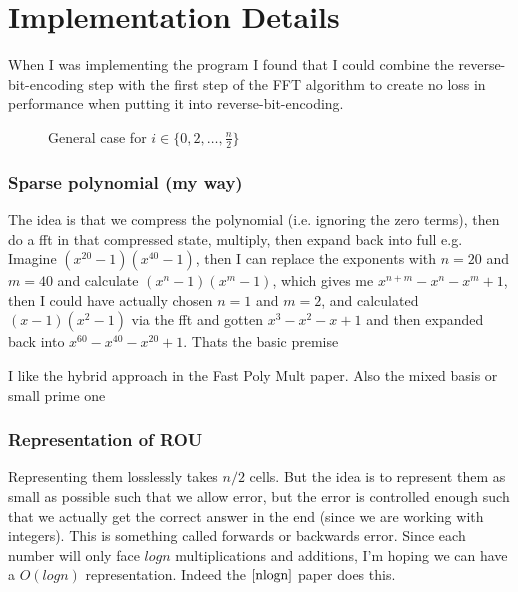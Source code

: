 \chapter{Implementation Details}\label{impl-details}

When I was implementing the program I found that I could combine the reverse-bit-encoding step with the first step of the FFT algorithm to create no loss in performance when putting it into reverse-bit-encoding.
\begin{figure}
    \centering
    \caption{General case for $i \in \{0, 2, \ldots, \frac{n}{2}\}$}
\end{figure}

\subsection{Sparse polynomial (my way)}

The idea is that we compress the polynomial (i.e. ignoring the zero terms), then do a fft in that compressed state, multiply, then expand back into full
e.g. Imagine $(x^{20} - 1)(x^{40} - 1)$, then I can replace the exponents with $n = 20$ and $m = 40$ and calculate $(x^n - 1)(x^m -1)$, which gives me $x^{n+m} - x^n - x^m + 1$, then I could have actually chosen $n = 1$ and $m = 2$, and calculated $(x - 1)(x^2 - 1)$ via the fft and gotten $x^3 - x^2 - x + 1$ and then expanded back into $x^{60} - x^{40} - x^{20} + 1$. Thats the basic premise

I like the hybrid approach in the Fast Poly Mult paper. Also the mixed basis or small prime one

\subsection{Representation of ROU}

Representing them losslessly takes $n/2$ cells. But the idea is to represent them as small as possible such that we allow error, but the error is controlled enough such that we actually get the correct answer in the end (since we are working with integers). This is something called forwards or backwards error. Since each number will only face $log n$ multiplications and additions, I'm hoping we can have a $O(log n)$ representation. Indeed the $\cite{nlogn}$ paper does this.

